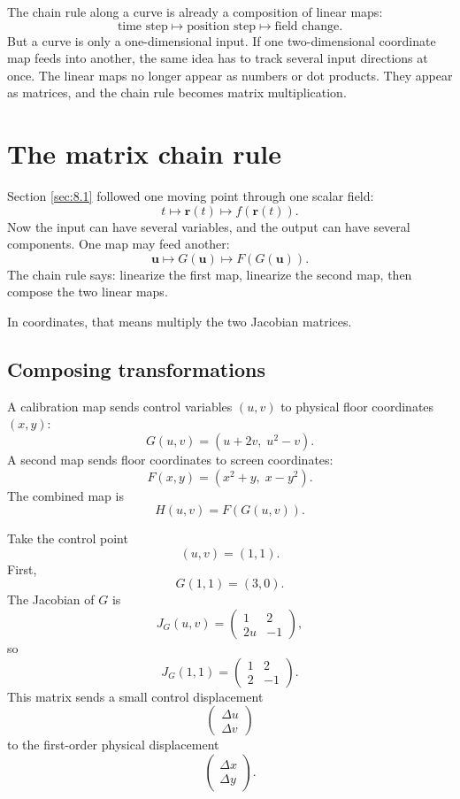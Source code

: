 The chain rule along a curve is already a composition of linear maps:
\[
    \text{time step}
    \longmapsto
    \text{position step}
    \longmapsto
    \text{field change}.
\]
But a curve is only a one-dimensional input.  If one two-dimensional coordinate map
feeds into another, the same idea has to track several input directions at once.  The
linear maps no longer appear as numbers or dot products.  They appear as matrices,
and the chain rule becomes matrix multiplication.

\section{The matrix chain rule}
\label{sec:8.2}

Section \ref{sec:8.1} followed one moving point through one scalar field:
\[
    t\longmapsto \mathbf r(t)\longmapsto f(\mathbf r(t)).
\]
Now the input can have several variables, and the output can have several components.
One map may feed another:
\[
    \mathbf u
    \longmapsto
    G(\mathbf u)
    \longmapsto
    F(G(\mathbf u)).
\]
The chain rule says: linearize the first map, linearize the second map, then compose
the two linear maps.

In coordinates, that means multiply the two Jacobian matrices.

\subsection{Composing transformations}

A calibration map sends control variables \((u,v)\) to physical floor coordinates
\((x,y)\):
\[
    G(u,v)=(u+2v,\;u^2-v).
\]
A second map sends floor coordinates to screen coordinates:
\[
    F(x,y)=(x^2+y,\;x-y^2).
\]
The combined map is
\[
    H(u,v)=F(G(u,v)).
\]

Take the control point
\[
    (u,v)=(1,1).
\]
First,
\[
    G(1,1)=(3,0).
\]
The Jacobian of \(G\) is
\[
    J_G(u,v)
    =
    \begin{pmatrix}
        1 & 2\\
        2u & -1
    \end{pmatrix},
\]
so
\[
    J_G(1,1)
    =
    \begin{pmatrix}
        1 & 2\\
        2 & -1
    \end{pmatrix}.
\]
This matrix sends a small control displacement
\[
    \begin{pmatrix}\Delta u\\ \Delta v\end{pmatrix}
\]
to the first-order physical displacement
\[
    \begin{pmatrix}\Delta x\\ \Delta y\end{pmatrix}.
\]

